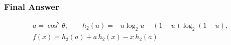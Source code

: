 \subsubsection*{Final Answer}

\[
\boxed{
\begin{gathered}
a=\cos^2\theta,\qquad
h_2(u)=-u\log_2u-(1-u)\log_2(1-u),\\
f(x)=h_2(a)+a\,h_2(x)-x\,h_2(a)
\end{gathered}
}
\]
